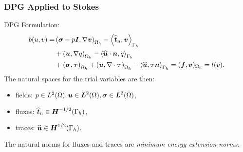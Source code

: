 \documentclass[mathserif]{beamer}
\newcommand{\NVRvect}[1]{\ensuremath\boldsymbol{#1}}
\newcommand{\vect}[1]{\ensuremath\boldsymbol{#1}}
\newcommand{\NVRtensor}[1]{\NVRvect{#1}}
\newcommand{\NVRgrad}{\nabla}
\newcommand{\NVRdiv}{\NVRgrad \cdot}
\begin{document}
\begin{frame}
\frametitle{DPG Applied to Stokes}
DPG Formulation:
\begin{align*}
b(u,v) =& \left(\NVRtensor{\sigma} - p \NVRtensor{I}, \NVRgrad \vect{v} \right)_{\Omega_{h}} - \left\langle \widehat{\vect{t}}_{n}, \vect{v} \right\rangle_{\Gamma_{h}}\\
&+\left(\vect{u}, \NVRgrad q \right)_{\Omega_{h}} -  \left\langle \widehat{\vect{u}} \cdot \vect{n}, q  \right\rangle_{\Gamma_{h}}\\
&+ \left( \NVRtensor{\sigma}, \NVRtensor{\tau} \right)_{\Omega_{h}} + \left( \vect{u}, \NVRdiv \NVRtensor{\tau} \right)_{\Omega_{h}} - \left\langle \widehat{\vect{u}}, \NVRtensor{\tau} \vect{n}  \right\rangle_{\Gamma_{h}} = (\vect{f}, \vect{v} )_{\Omega_{h}} = l(v).
\end{align*}
The natural spaces for the trial variables are then:
\begin{itemize}
\item fields: $p \in L^{2}(\Omega), \vect{u} \in \vect{L}^{2}(\Omega), \NVRtensor{\sigma} \in \vect{L}^{2}(\Omega)$,
\item fluxes: $\widehat{\vect{t}}_{n} \in \NVRtensor{H}^{-1/2}(\Gamma_{h})$,
\item traces: $\widehat{\vect{u}} \in \vect{H}^{1/2}(\Gamma_{h})$.
\end{itemize}

The natural norms for fluxes and traces are \emph{minimum energy extension norms}.

\end{frame}

\end{document}
